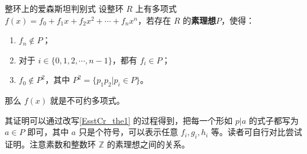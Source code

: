 \begin{theorem}{整环上的爱森斯坦判别式}
设整环 $R$ 上有多项式 $f(x)=f_0+f_1x+f_2x^2+\cdots+f_nx^n$，若存在 $R$ 的\textbf{素理想}$P$，使得：
\begin{enumerate}
\item $f_n\not\in P$；
\item 对于 $i\in\{0, 1, 2, \cdots, n-1\}$，都有 $f_i\in P$；
\item $f_0\not\in P^2$，其中 $P^2=\{p_1p_2|p_i\in P\}$。
\end{enumerate}
那么 $f(x)$ 就是不可约多项式。
\end{theorem}

其证明可以通过改写\autoref{EsstCr_the1} 的过程得到，把每一个形如 $p|a$ 的式子都写为 $a\in P$ 即可，其中 $a$ 只是个符号，可以表示任意 $f_i, g_i, h_i$ 等。读者可自行对比尝试证明。注意素数和整数环 $\mathbb{Z}$ 的素理想之间的关系。






